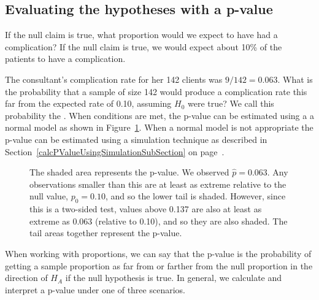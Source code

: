 \subsection{Evaluating the hypotheses with a p-value}

\begin{examplewrap}
\begin{nexample}
{If the null claim is true, what proportion would we expect to have had a complication?  }If the null claim is true, we would expect about 10\% of the patients to have a complication.
\end{nexample}
\end{examplewrap}

The consultant's complication rate for her 142 clients was $9/142 = 0.063$. What is the probability that a sample of size 142 would produce a complication rate this far from the expected rate of 0.10, assuming $H_0$ were true?  We call this probability the .  When conditions are met, the p-value can be estimated using a a normal model as shown in Figure~\ref{MedConsNullNormal}.  When a normal model is not appropriate the p-value can be estimated using a simulation technique as described in Section~\ref{calcPValueUsingSimulationSubSection} on page~\pageref{calcPValueUsingSimulationSubSection}.

\begin{figure}[ht]
\centering
{}
\caption{The shaded area represents the p-value. We observed $\hat{p} = 0.063$.  Any observations smaller than this are at least as extreme relative to the null value, $p_0 = 0.10$, and so the lower tail is shaded. However, since this is a two-sided test, values above 0.137 are also at least as extreme as 0.063 (relative to 0.10), and so they are also shaded. The tail areas together represent the p-value.}
\label{MedConsNullNormal}
\end{figure}

When working with proportions, we can say that the p-value is the probability of getting a sample proportion as far from or farther from the null proportion in the direction of $H_A$ if the null hypothesis is true.  In general, we calculate and interpret a p-value under one of three scenarios.

